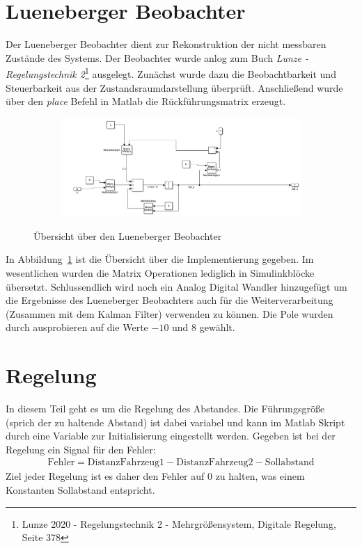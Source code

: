 \section{Lueneberger Beobachter}\label{sec:Lueneberger Beobachter}
Der Lueneberger Beobachter dient zur Rekonstruktion der nicht messbaren Zustände
des Systems. Der Beobachter wurde anlog zum Buch \textit{Lunze - Regelungstechnik
2}\footnote{Lunze 2020 - Regelungstechnik 2 - Mehrgrößensystem, Digitale Regelung,
Seite 378} ausgelegt. Zunächst wurde dazu die Beobachtbarkeit und Steuerbarkeit
aus der Zustandsraumdarstellung überprüft. Anschließend wurde über den
\textit{place} Befehl in Matlab die Rückführungsmatrix erzeugt.
\begin{figure}[hbt]
\centering
\begin{subfigure}{0.6\textwidth}
    \centering
    \includegraphics*[width=\textwidth]{figures/lueneberger.png}
\end{subfigure}
    \caption{Übersicht über den Lueneberger Beobachter
    \label{fig:lueneberger}}
\end{figure}    
In Abbildung~\ref{fig:lueneberger} ist die Übersicht über die Implementierung
gegeben. Im wesentlichen wurden die Matrix Operationen lediglich in
Simulinkblöcke übersetzt. Schlussendlich wird noch ein Analog Digital Wandler
hinzugefügt um die Ergebnisse des Lueneberger Beobachters auch für die
Weiterverarbeitung (Zusammen mit dem Kalman Filter) verwenden zu können. Die
Pole wurden durch ausprobieren auf die Werte $-10$ und $8$ gewählt.

\section{Regelung}\label{sec:Regelung}
In diesem Teil geht es um die Regelung des Abstandes. Die Führungsgröße (sprich
der zu haltende Abstand) ist dabei variabel und kann im Matlab Skript durch eine
Variable zur Initialisierung eingestellt werden. Gegeben ist bei der Regelung
ein Signal für den Fehler:
\begin{align*}
    \mathrm{Fehler} = \mathrm{Distanz Fahrzeug 1} - \mathrm{Distanz Fahrzeug 2} - \mathrm{Sollabstand}
\end{align*}
Ziel jeder Regelung ist es daher den Fehler auf 0 zu halten, was einem
Konstanten Sollabstand entspricht.


